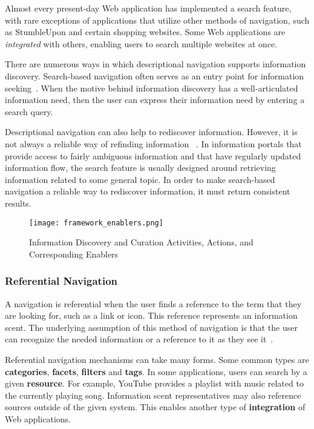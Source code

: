 {{{Almost every present-day Web application has implemented a search feature, with rare exceptions of applications that utilize other methods of navigation, such as StumbleUpon and certain shopping websites. Some Web applications are \textit{integrated} with others, enabling users to search multiple websites at once.    

There are numerous ways in which descriptional navigation supports information discovery. Search-based navigation often serves as an entry point for information seeking~\cite{levene2011introduction}. When the motive behind information discovery has a well-articulated information need, then the user can express their information need by entering a search query. 

Descriptional navigation can also help to rediscover information. However, it is not always a reliable way of refinding information ~\cite{cockburn2003improving}. In information portals that provide access to fairly ambiguous information and that have regularly updated information flow, the search feature is usually designed around retrieving information related to some general topic. In order to make search-based navigation a reliable way to rediscover information, it must return consistent results. 
} %

\pagebreak

\begin{figure}[ht!]
	\noindent
	\centering
	\texttt{[image: framework\_enablers.png]}
	\caption{Information Discovery and Curation Activities, Actions, and Corresponding Enablers}
	\label{fig:enablers} 
\end{figure}


{\subsubsection{Referential Navigation}
A navigation is referential when the user finds a reference to the term that they are looking for, such as a link or icon. This reference represents an information scent. The underlying assumption of this method of navigation is that the user can recognize the needed information or a reference to it as they see it~\cite{waterworth1991model}. 

Referential navigation mechanisms can take many forms. Some common types are \textbf{categories}, \textbf{facets}, \textbf{filters} and \textbf{tags}. In some applications, users can search by a given \textbf{resource}. For example, YouTube provides a playlist with music related to the currently playing song. Information scent representatives may also reference sources outside of the given system. This enables another type of \textbf{integration} of Web applications. 

}}}
